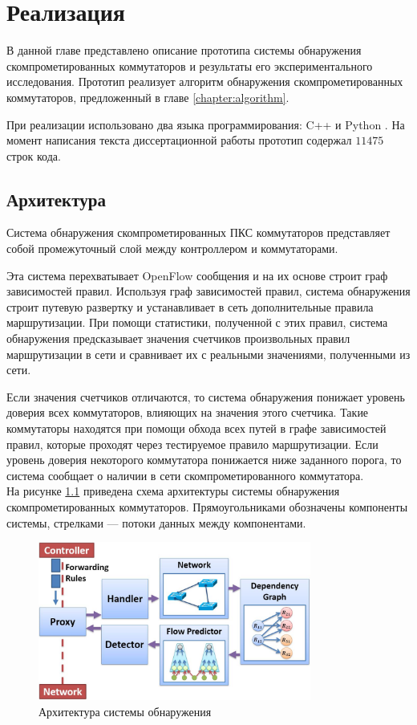 \documentclass[../thesis.tex]{subfiles}
\begin{document}
\chapter{Реализация} \label{chapter:implementation}

В данной главе представлено описание прототипа системы обнаружения скомпрометированных коммутаторов и результаты его экспериментального исследования.
Прототип реализует алгоритм обнаружения скомпрометированных коммутаторов, предложенный в главе \ref{chapter:algorithm}.

При реализации использовано два языка программирования: C++ \cite{stroustrup2000c++} и Python \cite{van2011python}.
На момент написания текста диссертационной работы прототип содержал $11475$ строк кода.

\section{Архитектура}

Система обнаружения скомпрометированных ПКС коммутаторов представляет собой промежуточный слой между контроллером и коммутаторами.

Эта система перехватывает OpenFlow сообщения и на их основе строит граф зависимостей правил.
Используя граф зависимостей правил, система обнаружения строит путевую развертку и устанавливает в сеть дополнительные правила маршрутизации.
При помощи статистики, полученной с этих правил, система обнаружения предсказывает значения счетчиков произвольных правил маршрутизации в сети и сравнивает их с реальными значениями, полученными из сети.

Если значения счетчиков отличаются, то система обнаружения понижает уровень доверия всех коммутаторов, влияющих на значения этого счетчика.
Такие коммутаторы находятся при помощи обхода всех путей в графе зависимостей правил, которые проходят через тестируемое правило маршрутизации.
Если уровень доверия некоторого коммутатора понижается ниже заданного порога, то система сообщает о наличии в сети скомпрометированного коммутатора.
\\

На рисунке \ref{fig:architecture} приведена схема архитектуры системы обнаружения скомпрометированных коммутаторов.
Прямоугольниками обозначены компоненты системы, стрелками --- потоки данных между компонентами.

\begin{figure}
\centering
\includegraphics[width=0.8\textwidth]{figures/architecture.jpg}
\caption{Архитектура системы обнаружения} \label{fig:architecture}
\end{figure}
\end{document}
